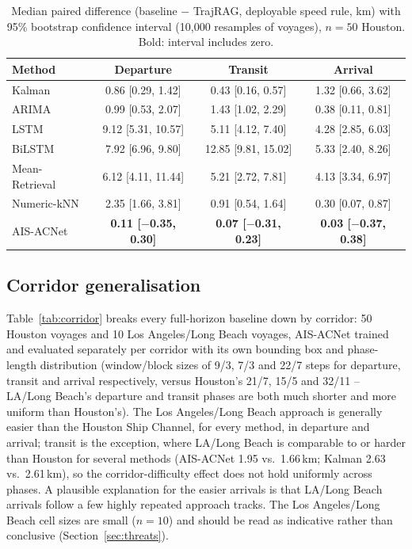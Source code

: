 \begin{table}[t]
\centering
\caption{Median paired difference (baseline $-$ TrajRAG, deployable speed
rule, km) with 95\% bootstrap confidence interval (10,000 resamples of
voyages), $n=50$ Houston. Bold: interval includes zero.}
\label{tab:bootstrap}
\footnotesize
\setlength{\tabcolsep}{4pt}
\begin{tabular}{lccc}
\toprule
Method & Departure & Transit & Arrival \\
\midrule
Kalman & 0.86 [0.29, 1.42] & 0.43 [0.16, 0.57] & 1.32 [0.66, 3.62] \\
ARIMA & 0.99 [0.53, 2.07] & 1.43 [1.02, 2.29] & 0.38 [0.11, 0.81] \\
LSTM & 9.12 [5.31, 10.57] & 5.11 [4.12, 7.40] & 4.28 [2.85, 6.03] \\
BiLSTM & 7.92 [6.96, 9.80] & 12.85 [9.81, 15.02] & 5.33 [2.40, 8.26] \\
Mean-Retrieval & 6.12 [4.11, 11.44] & 5.21 [2.72, 7.81] & 4.13 [3.34, 6.97] \\
Numeric-kNN & 2.35 [1.66, 3.81] & 0.91 [0.54, 1.64] & 0.30 [0.07, 0.87] \\
AIS-ACNet & \textbf{0.11 [$-$0.35, 0.30]} & \textbf{0.07 [$-$0.31, 0.23]} & \textbf{0.03 [$-$0.37, 0.38]} \\
\bottomrule
\end{tabular}
\end{table}

\subsection{Corridor generalisation}

Table~\ref{tab:corridor} breaks every full-horizon baseline down by
corridor: 50 Houston voyages and 10 Los Angeles/Long Beach voyages,
AIS-ACNet trained and evaluated separately per corridor with its own
bounding box and phase-length distribution (window/block sizes of 9/3, 7/3
and 22/7 steps for departure, transit and arrival respectively, versus
Houston's 21/7, 15/5 and 32/11 -- LA/Long Beach's departure and transit
phases are both much shorter and more uniform than Houston's). The
Los Angeles/Long Beach approach is generally easier than the Houston Ship
Channel, for every method, in departure and arrival; transit is the
exception, where LA/Long Beach is comparable to or harder than Houston for
several methods (AIS-ACNet 1.95 vs.\ 1.66\,km; Kalman 2.63 vs.\
2.61\,km), so the corridor-difficulty effect does not hold uniformly across
phases. A plausible explanation for the easier arrivals is that LA/Long
Beach arrivals follow a few highly repeated approach tracks. The
Los Angeles/Long Beach cell sizes are small ($n=10$) and should be read as
indicative rather than conclusive (Section~\ref{sec:threats}).


